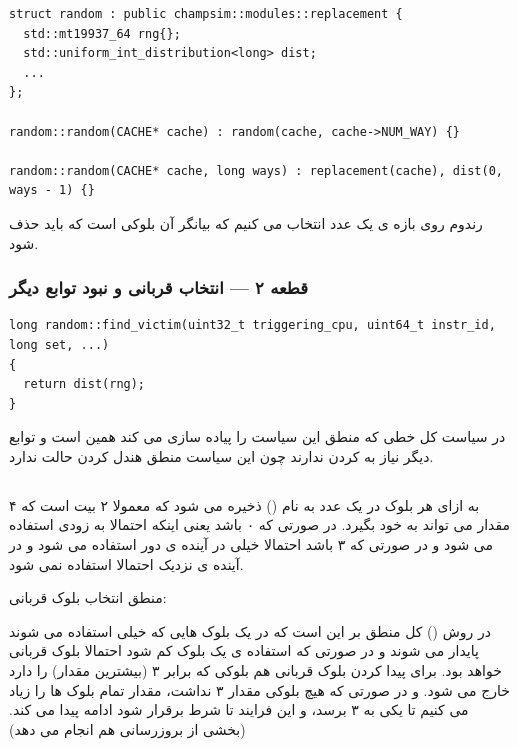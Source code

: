 \documentclass[12pt,a4paper]{article}
\begin{document}
\begin{latin}
\begin{lstlisting}
struct random : public champsim::modules::replacement {
  std::mt19937_64 rng{};
  std::uniform_int_distribution<long> dist;
  ...
};

random::random(CACHE* cache) : random(cache, cache->NUM_WAY) {}

random::random(CACHE* cache, long ways) : replacement(cache), dist(0, ways - 1) {}
\end{lstlisting}
\end{latin}

رندوم روی بازه ی \lr{\texttt{[0, ways-1]}} یک عدد انتخاب می کنیم که بیانگر آن بلوکی است که باید حذف شود.

\subsubsection{قطعه ۲ — انتخاب قربانی و نبود توابع دیگر}

\begin{latin}
\begin{lstlisting}
long random::find_victim(uint32_t triggering_cpu, uint64_t instr_id, long set, ...)
{
  return dist(rng);
}
\end{lstlisting}
\end{latin}

در سیاست  کل خطی که منطق این سیاست را پیاده سازی می کند همین است و توابع دیگر نیاز به  کردن ندارند چون این سیاست منطق هندل کردن حالت ندارد.

\subsection{}

به ازای هر بلوک در  یک عدد به نام  () ذخیره می شود که معمولا ۲ بیت است که ۴ مقدار می تواند به خود بگیرد. در صورتی که ۰ باشد یعنی اینکه احتمالا به زودی استفاده می شود و در صورتی که ۳ باشد احتمالا خیلی در آینده ی دور استفاده می شود و در آینده ی نزدیک احتمالا استفاده نمی شود.

منطق انتخاب بلوک قربانی:

در روش  () کل منطق بر این است که در یک  بلوک هایی که خیلی استفاده می شوند پایدار می شوند و در صورتی که استفاده ی یک بلوک کم شود احتمالا بلوک قربانی خواهد بود. برای پیدا کردن بلوک قربانی هم بلوکی که  برابر ۳ (بیشترین مقدار) را دارد خارج می شود. و در صورتی که هیچ بلوکی مقدار ۳ نداشت، مقدار  تمام بلوک ها را زیاد می کنیم تا یکی به ۳ برسد، و این فرایند تا شرط برقرار شود ادامه پیدا می کند. (بخشی از بروزرسانی هم انجام می دهد)
\end{document}
